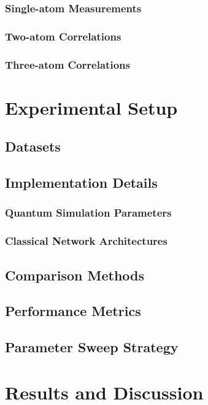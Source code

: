 \documentclass[conference]{IEEEtran}
\begin{document}
\subsubsection{Single-atom Measurements}
\subsubsection{Two-atom Correlations}
\subsubsection{Three-atom Correlations}

\section{Experimental Setup}
\subsection{Datasets}
\subsection{Implementation Details}
\subsubsection{Quantum Simulation Parameters}
\subsubsection{Classical Network Architectures}
\subsection{Comparison Methods}
\subsection{Performance Metrics}
\subsection{Parameter Sweep Strategy}

\section{Results and Discussion}
\end{document}
